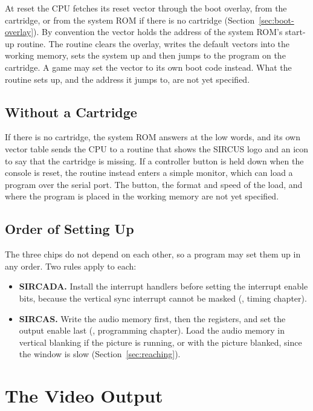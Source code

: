 At reset the CPU fetches its reset vector through the boot overlay, from the cartridge, or from the system ROM if there
is no cartridge (Section~\ref{sec:boot-overlay}). By convention the vector holds the address of the system ROM's
start-up routine. The routine clears the overlay, writes the default vectors into the working memory, sets the system
up and then jumps to the program on the cartridge. A game may set the vector to its own boot code instead. What the
routine sets up, and the address it jumps to, are not yet specified.

\subsection{Without a Cartridge}

If there is no cartridge, the system ROM answers at the low words, and its own vector table sends the CPU to a routine
that shows the SIRCUS logo and an icon to say that the cartridge is missing. If a controller button is held down when
the console is reset, the routine instead enters a simple monitor, which can load a program over the serial port. The
button, the format and speed of the load, and where the program is placed in the working memory are not yet specified.

\subsection{Order of Setting Up}

The three chips do not depend on each other, so a program may set them up in any order. Two rules apply to each:

\begin{itemize}
	\item \textbf{SIRCADA.} Install the interrupt handlers before setting the interrupt enable bits, because the vertical
	      sync interrupt cannot be masked (\videomanual{}, timing chapter).
	\item \textbf{SIRCAS.} Write the audio memory first, then the registers, and set the output enable last
	      (\audiomanual{}, programming chapter). Load the audio memory in vertical blanking if the picture is running, or
	      with the picture blanked, since the window is slow (Section~\ref{sec:reaching}).
\end{itemize}

\section{The Video Output}

